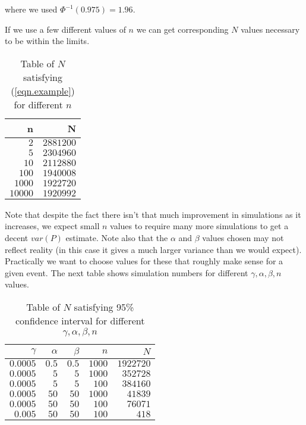 \documentclass[
10pt, %
a4paper, %
oneside, %
headinclude,footinclude, %
BCOR5mm, %
]{scrartcl}
\begin{document}
where we used $\Phi^{-1}(0.975) = 1.96$.

If we use a few different values of $n$ we can get corresponding $N$ values necessary to be within the limits.

\begin{table}[hbt]
\caption{Table of $N$ satisfying (\ref{eqn.example}) for different $n$}
\centering
\begin{tabular}{rr}

n & N \\
\midrule
$2$ & $2881200$ \\
$5$ & $2304960$ \\
$10$ & $2112880$ \\
$100$ & $1940008$ \\
$1000$ & $1922720$ \\
$10000$ & $1920992$ \\
\bottomrule
\end{tabular}
\label{tab:label}
\end{table}


Note that despite the fact there isn't that much improvement in simulations as it increases, we expect small $n$ values to require many more simulations to get a decent $var(P)$ estimate. Note also that the $\alpha$ and $\beta$ values chosen may not reflect reality (in this case it gives a much larger variance than we would expect). Practically we want to choose values for these that roughly make sense for a given event. The next table shows simulation numbers for different $\gamma, \alpha, \beta, n$ values.

\begin{table}[hbt]
\caption{Table of $N$ satisfying 95\% confidence interval for different $\gamma, \alpha, \beta, n$}
\centering
\begin{tabular}{rrrrr}

$\gamma$ & $\alpha$ & $\beta$ & $n$ & $N$ \\
\midrule
$0.0005$ & $0.5$ & $0.5$ & $1000$ & $1922720$ \\
$0.0005$ & $5$ & $5$ & $1000$ & $352728$ \\
$0.0005$ & $5$ & $5$ & $100$ & $384160$ \\
$0.0005$ & $50$ & $50$ & $1000$ & $41839$ \\
$0.0005$ & $50$ & $50$ & $100$ & $76071$ \\
$0.005$ & $50$ & $50$ & $100$ & $418$ \\

\bottomrule
\end{tabular}
\label{tab:label}
\end{table}
\end{document}
